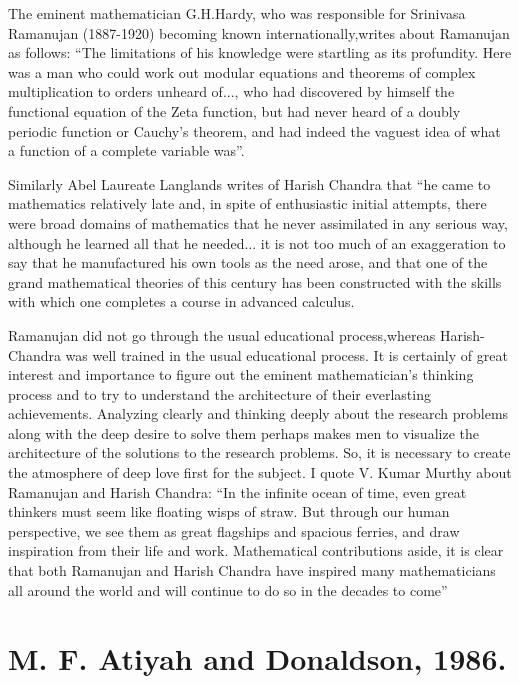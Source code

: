 The eminent mathematician G.H.Hardy, who was responsible for Srinivasa Ramanujan (1887-1920) becoming known internationally,\break writes about Ramanujan as follows: “The limitations of his knowledge were startling as its profundity. Here was a man who could work out modular equations and theorems of complex   multiplication to orders unheard of..., who had discovered by himself the functional equation of the Zeta function, but had never heard of a doubly periodic function or Cauchy’s theorem,  and had indeed the vaguest idea of what a function of a complete variable was”.
\vskip 2pt
 
Similarly Abel Laureate Langlands \cite{chap17-key06RPL} writes of Harish Chandra that “he came to mathematics relatively late and, in spite of enthusiastic initial attempts, there were broad domains of mathematics that he never assimilated in any serious way, although he learned all that he needed... it is not too much of an exaggeration to say that he manufactured his own tools as the need arose, and that one of the grand mathematical theories of this century has been constructed with the skills with which one completes a course in advanced calculus.
\vskip 2pt
 
Ramanujan did not go through the usual educational process,\break whereas Harish-Chandra was well trained in the usual educational process.  It is certainly of great interest and importance to figure out the eminent mathematician’s thinking process and to try to understand the architecture of their everlasting achievements. Analyzing clearly and thinking deeply about the research problems along with the deep desire to solve them perhaps makes men to visualize the architecture of the solutions to the research problems. So, it is necessary to create the atmosphere of deep love first for the subject.  I quote V. Kumar Murthy about Ramanujan and Harish Chandra: “In the infinite ocean of time, even great thinkers must seem like floating wisps of straw. But through our human perspective, we see them as great flagships and spacious ferries, and draw inspiration from their life and work. Mathematical contributions aside, it is clear that both Ramanujan and Harish Chandra have inspired many mathematicians all around the world and will continue to do so in the decades to come”
 
\section*{M. F. Atiyah and Donaldson, 1986.}

